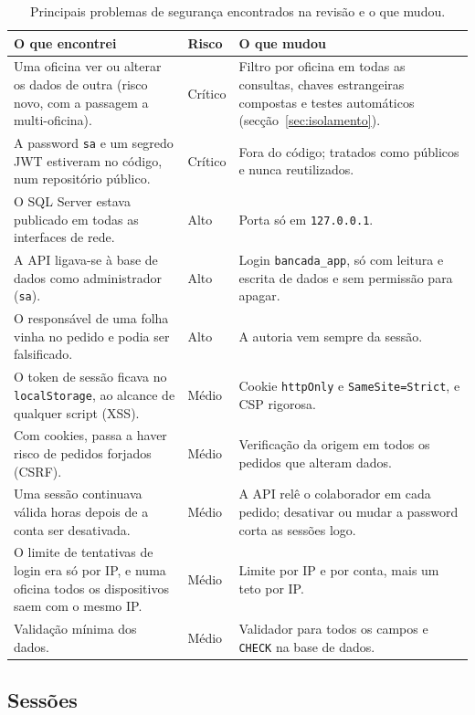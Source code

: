 \documentclass[a4paper,12pt]{article}
\begin{document}
\begin{table}[htbp]
\centering
\small
\begin{tabularx}{\textwidth}{@{}Lp{1.5cm}L@{}}
\toprule
\textbf{O que encontrei} & \textbf{Risco} & \textbf{O que mudou} \\
\midrule
Uma oficina ver ou alterar os dados de outra (risco novo, com a passagem a multi-oficina). & Crítico & Filtro por oficina em todas as consultas, chaves estrangeiras compostas e testes automáticos (secção~\ref{sec:isolamento}). \\
A password \texttt{sa} e um segredo \acs{JWT} estiveram no código, num repositório público. & Crítico & Fora do código; tratados como públicos e nunca reutilizados. \\
O SQL Server estava publicado em todas as interfaces de rede. & Alto & Porta só em \texttt{127.0.0.1}. \\
A \ac{API} ligava-se à base de dados como administrador (\texttt{sa}). & Alto & Login \texttt{bancada\_app}, só com leitura e escrita de dados e sem permissão para apagar. \\
O responsável de uma folha vinha no pedido e podia ser falsificado. & Alto & A autoria vem sempre da sessão. \\
O token de sessão ficava no \texttt{localStorage}, ao alcance de qualquer script (\acs{XSS}). & Médio & Cookie \texttt{httpOnly} e \texttt{SameSite=Strict}, e \ac{CSP} rigorosa. \\
Com cookies, passa a haver risco de pedidos forjados (\acs{CSRF}). & Médio & Verificação da origem em todos os pedidos que alteram dados. \\
Uma sessão continuava válida horas depois de a conta ser desativada. & Médio & A \ac{API} relê o colaborador em cada pedido; desativar ou mudar a password corta as sessões logo. \\
O limite de tentativas de login era só por IP, e numa oficina todos os dispositivos saem com o mesmo IP. & Médio & Limite por IP e por conta, mais um teto por IP. \\
Validação mínima dos dados. & Médio & Validador para todos os campos e \texttt{CHECK} na base de dados. \\
\bottomrule
\end{tabularx}
\caption{Principais problemas de segurança encontrados na revisão e o que mudou.}
\label{tab:seguranca}
\end{table}

\subsection{Sessões}
\end{document}

